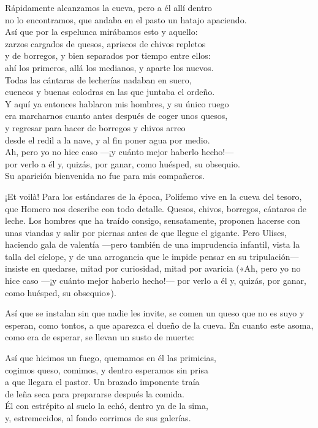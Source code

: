 \begin{versocita}
Rápidamente alcanzamos la cueva, pero a él allí dentro\\
no lo encontramos, que andaba en el pasto un hatajo apaciendo.\\
Así que por la espelunca mirábamos esto y aquello:\\
zarzos cargados de quesos, apriscos de chivos repletos\\
y de borregos, y bien separados por tiempo entre ellos:\\
ahí los primeros, allá los medianos, y aparte los nuevos.\\
Todas las cántaras de lecherías nadaban en suero,\\
cuencos y buenas colodras en las que juntaba el ordeño.\\
Y aquí ya entonces hablaron mis hombres, y su único ruego\\
era marcharnos cuanto antes después de coger unos quesos,\\
y regresar para hacer de borregos y chivos arreo\\
desde el redil a la nave, y al fin poner agua por medio.\\
Ah, pero yo no hice caso ---¡y cuánto mejor haberlo hecho!---\\
por verlo a él y, quizás, por ganar, como huésped, su obsequio.\\
Su aparición bienvenida no fue para mis compañeros.
\end{versocita}

¡Et voilà! Para los estándares de la época, Polifemo vive en la cueva del tesoro, que Homero nos describe con todo detalle. Quesos, chivos, borregos, cántaros de leche. Los hombres que ha traído consigo, sensatamente, proponen hacerse con unas viandas y salir por piernas antes de que llegue el gigante. Pero Ulises, haciendo gala de valentía ---pero también de una imprudencia infantil, vista la talla del cíclope, y de una arrogancia que le impide pensar en su tripulación--- insiste en quedarse, mitad por curiosidad, mitad por avaricia («Ah, pero yo no hice caso ---¡y cuánto mejor haberlo hecho!--- por verlo a él y, quizás, por ganar, como huésped, su obsequio»).

Así que se instalan sin que nadie les invite, se comen un queso que no es suyo y esperan, como tontos, a que aparezca el dueño de la cueva. En cuanto este asoma, como era de esperar, se llevan un susto de muerte:

\begin{versocita}
Así que hicimos un fuego, quemamos en él las primicias,\\
cogimos queso, comimos, y dentro esperamos sin prisa\\
a que llegara el pastor. Un brazado imponente traía\\
de leña seca para prepararse después la comida.\\
Él con estrépito al suelo la echó, dentro ya de la sima,\\
y, estremecidos, al fondo corrimos de sus galerías.
\end{versocita}

